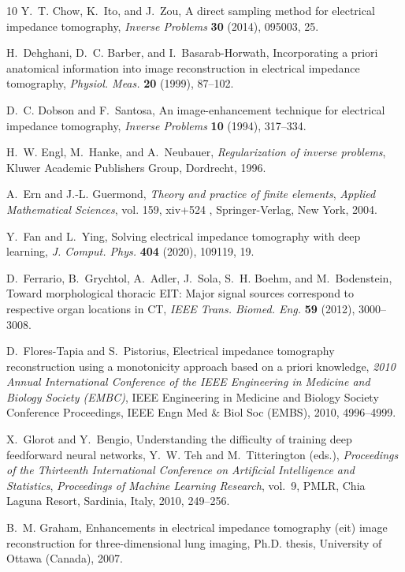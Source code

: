 \documentclass[11pt]{article}
\begin{document}
\begin{thebibliography}{10}
	Y.~T. Chow, K.~Ito, and J.~Zou, A direct sampling method for electrical
	impedance tomography, \textit{Inverse Problems} \textbf{30} (2014), 095003,
	25.
	
	H.~Dehghani, D.~C. Barber, and I.~Basarab-Horwath, Incorporating a priori
	anatomical information into image reconstruction in electrical impedance
	tomography, \textit{Physiol. Meas.} \textbf{20} (1999), 87--102.
	
	D.~C. Dobson and F.~Santosa, An image-enhancement technique for electrical
	impedance tomography, \textit{Inverse Problems} \textbf{10} (1994), 317--334.
	
	H.~W. Engl, M.~Hanke, and A.~Neubauer, \textit{Regularization of inverse
		problems}, Kluwer Academic Publishers Group, Dordrecht, 1996.
	
	A.~Ern and J.-L. Guermond, \textit{Theory and practice of finite elements},
	\textit{Applied Mathematical Sciences}, vol. 159, xiv+524 , Springer-Verlag,
	New York, 2004.
	
	Y.~Fan and L.~Ying, Solving electrical impedance tomography with deep learning,
	\textit{J. Comput. Phys.} \textbf{404} (2020), 109119, 19.
	
	D.~Ferrario, B.~Grychtol, A.~Adler, J.~Sola, S.~H. Boehm, and M.~Bodenstein,
	Toward morphological thoracic {EIT}: Major signal sources correspond to
	respective organ locations in {CT}, \textit{IEEE Trans. Biomed. Eng.}
	\textbf{59} (2012), 3000--3008.
	
	D.~Flores-Tapia and S.~Pistorius, Electrical impedance tomography
	reconstruction using a monotonicity approach based on a priori knowledge,
	\textit{2010 Annual International Conference of the IEEE Engineering in
		Medicine and Biology Society (EMBC)}, IEEE Engineering in Medicine and
	Biology Society Conference Proceedings, IEEE Engn Med \& Biol Soc (EMBS),
	2010, 4996--4999.
	
	X.~Glorot and Y.~Bengio, Understanding the difficulty of training deep
	feedforward neural networks, Y.~W. Teh and M.~Titterington (eds.),
	\textit{Proceedings of the Thirteenth International Conference on Artificial
		Intelligence and Statistics}, \textit{Proceedings of Machine Learning
		Research}, vol.~9, PMLR, Chia Laguna Resort, Sardinia, Italy, 2010, 249--256.
	
	B.~M. Graham, Enhancements in electrical impedance tomography (eit) image
	reconstruction for three-dimensional lung imaging, Ph.D. thesis, University
	of Ottawa (Canada), 2007.
	

\end{thebibliography}
\end{document}

